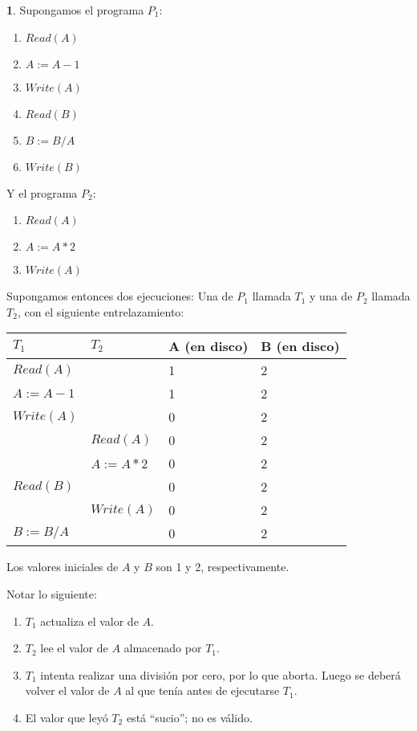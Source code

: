 \documentclass[english]{article}
\theoremstyle{definition}
\theoremstyle{definition}
\newtheorem{example}[thm]{\protect\examplename}
\providecommand{\examplename}{Ejemplo}
\begin{document}
\begin{example}
Supongamos el programa $P_1$:
\begin{enumerate}
    \item $Read(A)$
    \item $A := A - 1$
    \item $Write(A)$
    \item $Read(B)$
    \item $B := B/A$
    \item $Write(B)$
\end{enumerate}

Y el programa $P_2$:
\begin{enumerate}
    \item $Read(A)$
    \item $A := A*2$
    \item $Write(A)$
\end{enumerate}

Supongamos entonces dos ejecuciones: Una de $P_1$ llamada $T_1$ y una de $P_2$
llamada $T_2$, con el siguiente entrelazamiento:

\vspace{10pt}

\begin{tabular}{ l l l l }
  $T_1$         & $T_2$         & A (en disco)  & B (en disco)  \\
  \hline
  $Read(A)$     &               & 1             & 2             \\
  $A := A - 1$  &               & 1             & 2             \\
  $Write(A)$    &               & 0             & 2             \\
                & $Read(A)$     & 0             & 2             \\
                & $A := A*2$    & 0             & 2             \\
  $Read(B)$     &               & 0             & 2             \\
                & $Write(A)$    & 0             & 2             \\
  $B := B/A$    &               & 0             & 2             \\
\end{tabular}

\vspace{10pt}

Los valores iniciales de $A$ y $B$ son 1 y 2, respectivamente.

Notar lo siguiente:
\begin{enumerate}
    \item $T_1$ actualiza el valor de $A$.
    \item $T_2$ lee el valor de $A$ almacenado por $T_1$.
    \item $T_1$ intenta realizar una división por cero, por lo que aborta.
        Luego se deberá volver el valor de $A$ al que tenía antes de
        ejecutarse $T_1$.
    \item El valor que leyó $T_2$ está ``sucio''; no es válido.
\end{enumerate}
\end{example}
\end{document}

